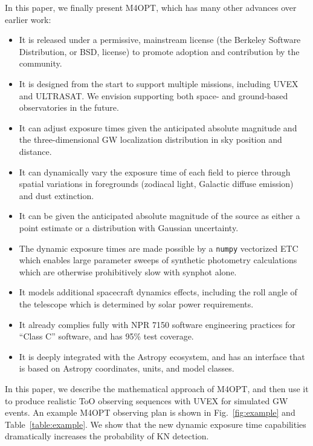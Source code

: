 \documentclass[twocolumn,times]{aastex631}
\begin{document}
In this paper, we finally present \ac{M4OPT}, which has many other advances over earlier work:
%
\begin{itemize}
    \item It is released under a permissive, mainstream license (the Berkeley Software Distribution, or BSD, license) to promote adoption and contribution by the community.
    \item It is designed from the start to support multiple missions, including \ac{UVEX} and ULTRASAT. We envision supporting both space- and ground-based observatories in the future.
    \item It can adjust exposure times given the anticipated absolute magnitude and the three-dimensional \ac{GW} localization distribution in sky position and distance.
    \item It can dynamically vary the exposure time of each field to pierce through spatial variations in foregrounds (zodiacal light, Galactic diffuse emission) and dust extinction.
    \item It can be given the anticipated absolute magnitude of the source as either a point estimate or a distribution with Gaussian uncertainty.
    \item The dynamic exposure times are made possible by a \texttt{numpy} \citep{harris2020array} vectorized \ac{ETC} which enables large parameter sweeps of synthetic photometry calculations which are otherwise prohibitively slow with synphot \citep{2018ascl.soft11001S} alone.
    \item It models additional spacecraft dynamics effects, including the roll angle of the telescope which is determined by solar power requirements.
    \item It already complies fully with \ac{NPR} 7150 \citep{NPR7150} software engineering practices for ``Class C'' software, and has 95\% test coverage.
    \item It is deeply integrated with the Astropy \citep{2013A&A...558A..33A,2018AJ....156..123A} ecosystem, and has an interface that is based on Astropy coordinates, units, and model classes.
\end{itemize}

In this paper, we describe the mathematical approach of \ac{M4OPT}, and then use it to produce realistic \ac{ToO} observing sequences with \ac{UVEX} for simulated \ac{GW} events. An example \ac{M4OPT} observing plan is shown in Fig.~\ref{fig:example} and Table~\ref{table:example}. We show that the new dynamic exposure time capabilities dramatically increases the probability of \ac{KN} detection.
\end{document}
